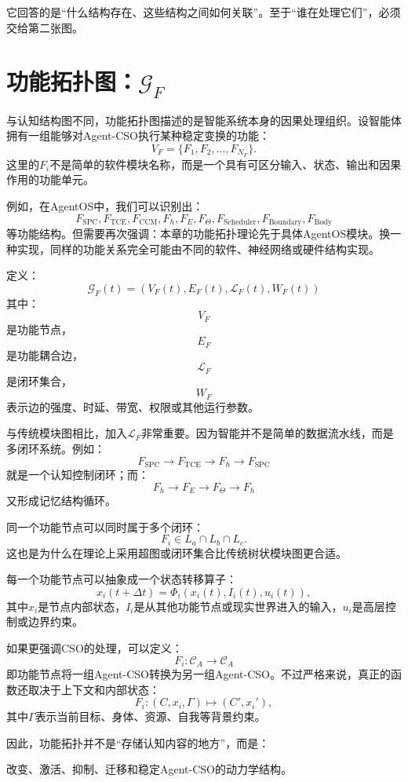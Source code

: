 它回答的是“什么结构存在、这些结构之间如何关联”。至于“谁在处理它们”，必须交给第二张图。

\section{功能拓扑图：$\mathcal G_F$}

与认知结构图不同，功能拓扑图描述的是智能系统本身的因果处理组织。设智能体拥有一组能够对Agent-CSO执行某种稳定变换的功能：
\[
V_F
=
\{
F_1,F_2,\ldots,F_{N_F}
\}.
\]
这里的$F_i$不是简单的软件模块名称，而是一个具有可区分输入、状态、输出和因果作用的功能单元。

例如，在AgentOS中，我们可以识别出：
\[
F_{\text{SPC}},
F_{\text{TCE}},
F_{\text{CCM}},
F_h,
F_E,
F_\Theta,
F_{\text{Scheduler}},
F_{\text{Boundary}},
F_{\text{Body}}
\]
等功能结构。但需要再次强调：本章的功能拓扑理论先于具体AgentOS模块。换一种实现，同样的功能关系完全可能由不同的软件、神经网络或硬件结构实现。

定义：
\[
\boxed{
\mathcal G_F(t)
=
\left(
V_F(t),
E_F(t),
\mathcal L_F(t),
W_F(t)
\right)
}
\]
其中：
\[
V_F
\]
是功能节点，
\[
E_F
\]
是功能耦合边，
\[
\mathcal L_F
\]
是闭环集合，
\[
W_F
\]
表示边的强度、时延、带宽、权限或其他运行参数。

与传统模块图相比，加入$\mathcal L_F$非常重要。因为智能并不是简单的数据流水线，而是多闭环系统。例如：
\[
F_{\text{SPC}}
\rightarrow
F_{\text{TCE}}
\rightarrow
F_h
\rightarrow
F_{\text{SPC}}
\]
就是一个认知控制闭环；而：
\[
F_h
\rightarrow
F_E
\rightarrow
F_\Theta
\rightarrow
F_h
\]
又形成记忆结构循环。

同一个功能节点可以同时属于多个闭环：
\[
F_i
\in
L_a\cap L_b\cap L_c.
\]
这也是为什么在理论上采用超图或闭环集合比传统树状模块图更合适。

每一个功能节点可以抽象成一个状态转移算子：
\[
x_i(t+\Delta t)
=
\Phi_i
\left(
x_i(t),
I_i(t),
u_i(t)
\right),
\]
其中$x_i$是节点内部状态，$I_i$是从其他功能节点或现实世界进入的输入，$u_i$是高层控制或边界约束。

如果更强调CSO的处理，可以定义：
\[
\boxed{
F_i:
\mathcal C_A
\rightarrow
\mathcal C_A
}
\]
即功能节点将一组Agent-CSO转换为另一组Agent-CSO。不过严格来说，真正的函数还取决于上下文和内部状态：
\[
F_i:
(C,x_i,\Gamma)
\mapsto
(C',x_i'),
\]
其中$\Gamma$表示当前目标、身体、资源、自我等背景约束。

因此，功能拓扑并不是“存储认知内容的地方”，而是：
\begin{statementbox}
改变、激活、抑制、迁移和稳定Agent-CSO的动力学结构。
\end{statementbox}

